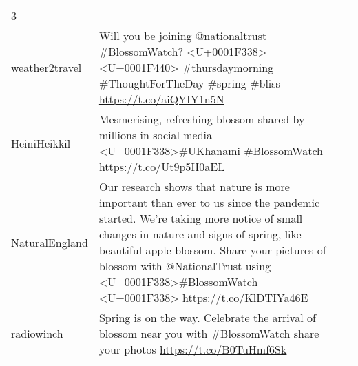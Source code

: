 \documentclass[
]{article}
\begin{document}
\begin{longtable}[]{@{}llr@{}}
\begin{minipage}[t]{0.18\columnwidth}
3\strut
\end{minipage}\tabularnewline
\begin{minipage}[t]{0.23\columnwidth}\raggedright
weather2travel\strut
\end{minipage} & \begin{minipage}[t]{0.42\columnwidth}\raggedright
Will you be joining @nationaltrust \#BlossomWatch?
\textless U+0001F338\textgreater\textless U+0001F440\textgreater{}
\#thursdaymorning \#ThoughtForTheDay \#spring \#bliss
\url{https://t.co/aiQYIY1n5N}\strut
\end{minipage} & \begin{minipage}[t]{0.18\columnwidth}\raggedleft
2\strut
\end{minipage}\tabularnewline
\begin{minipage}[t]{0.23\columnwidth}\raggedright
HeiniHeikkil\strut
\end{minipage} & \begin{minipage}[t]{0.42\columnwidth}\raggedright
Mesmerising, refreshing blossom shared by millions in social media
\textless U+0001F338\textgreater\#UKhanami \#BlossomWatch
\url{https://t.co/Ut9p5H0aEL}\strut
\end{minipage} & \begin{minipage}[t]{0.18\columnwidth}\raggedleft
2\strut
\end{minipage}\tabularnewline
\begin{minipage}[t]{0.23\columnwidth}\raggedright
NaturalEngland\strut
\end{minipage} & \begin{minipage}[t]{0.42\columnwidth}\raggedright
Our research shows that nature is more important than ever to us since
the pandemic started. We're taking more notice of small changes in
nature and signs of spring, like beautiful apple blossom. Share your
pictures of blossom with @NationalTrust using
\textless U+0001F338\textgreater\#BlossomWatch
\textless U+0001F338\textgreater{} \url{https://t.co/KlDTIYa46E}\strut
\end{minipage} & \begin{minipage}[t]{0.18\columnwidth}\raggedleft
2\strut
\end{minipage}\tabularnewline
\begin{minipage}[t]{0.23\columnwidth}\raggedright
radiowinch\strut
\end{minipage} & \begin{minipage}[t]{0.42\columnwidth}\raggedright
Spring is on the way. Celebrate the arrival of blossom near you with
\#BlossomWatch share your photos \url{https://t.co/B0TuHmf6Sk}\strut

\end{minipage}
\end{longtable}
\end{document}
